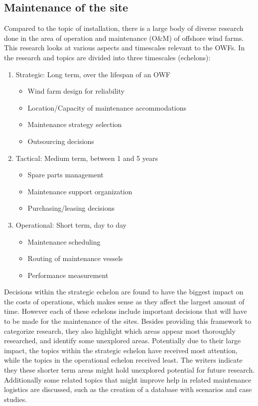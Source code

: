 \documentclass[a4paper,12pt]{article}
\begin{document}
\subsection{Maintenance of the site} \label{ss:maint}

Compared to the topic of installation, there is a large body of diverse research done in the area of operation and maintenance (O\&M) of offshore wind farms. This research looks at various aspects and timescales relevant to the OWFs. In \cite{shafiee2015maintenance} the research and topics are divided into three timescales (echelons):

\begin{enumerate}
\item Strategic: Long term, over the lifespan of an OWF
\begin{itemize}
\item Wind farm design for reliability
\item Location/Capacity of maintenance accommodations
\item Maintenance strategy selection
\item Outsourcing decisions
\end{itemize}
\item Tactical: Medium term, between 1 and 5 years
\begin{itemize}
\item Spare parts management
\item Maintenance support organization
\item Purchasing/leasing decisions
\end{itemize}
\item Operational: Short term, day to day
\begin{itemize}
\item Maintenance scheduling
\item Routing of maintenance vessels
\item Performance measurement
\end{itemize}
\end{enumerate}

Decisions within the strategic echelon are found to have the biggest impact on the costs of operations, which makes sense as they affect the largest amount of time. However each of these echelons include important decisions that will have to be made for the maintenance of the sites. Besides providing this framework to categorize research, they also highlight which areas appear most thoroughly researched, and identify some unexplored areas. Potentially due to their large impact, the topics within the strategic echelon have received most attention, while the topics in the operational echelon received least. The writers indicate they these shorter term areas might hold unexplored potential for future research. Additionally some related topics that might improve help in related maintenance logistics are discussed, such as the creation of a database with scenarios and case studies.
\end{document}
